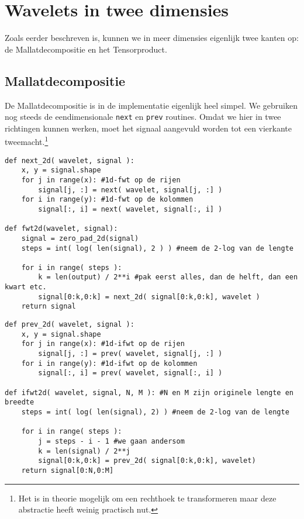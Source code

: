 \section{Wavelets in twee dimensies}
Zoals eerder beschreven is, kunnen we in meer dimensies eigenlijk twee kanten op: de Mallatdecompositie en het Tensorproduct.

\subsection{Mallatdecompositie}
De Mallatdecompositie is in de implementatie eigenlijk heel simpel. We gebruiken nog steeds de eendimensionale \texttt{next} en \texttt{prev} routines. Omdat we hier in twee richtingen kunnen werken, moet het signaal aangevuld worden tot een vierkante tweemacht.\footnote{Het is in theorie mogelijk om een rechthoek te transformeren maar deze abstractie heeft weinig practisch nut.}

\begin{lstlisting}[caption=De Mallatdecompositie in 2 dimensies]
def next_2d( wavelet, signal ):
	x, y = signal.shape
	for j in range(x): #1d-fwt op de rijen
		signal[j, :] = next( wavelet, signal[j, :] )
	for i in range(y): #1d-fwt op de kolommen
		signal[:, i] = next( wavelet, signal[:, i] )

def fwt2d(wavelet, signal):
	signal = zero_pad_2d(signal)
	steps = int( log( len(signal), 2 ) ) #neem de 2-log van de lengte
	
	for i in range( steps ):
		k = len(output) / 2**i #pak eerst alles, dan de helft, dan een kwart etc.
		signal[0:k,0:k] = next_2d( signal[0:k,0:k], wavelet )
	return signal
\end{lstlisting}
\begin{lstlisting}[caption=De omgekeerde Mallatdecompositie in 2 dimensies]
def prev_2d( wavelet, signal ):
	x, y = signal.shape
	for j in range(x): #1d-ifwt op de rijen
		signal[j, :] = prev( wavelet, signal[j, :] )
	for i in range(y): #1d-ifwt op de kolommen
		signal[:, i] = prev( wavelet, signal[:, i] )

def ifwt2d( wavelet, signal, N, M ): #N en M zijn originele lengte en breedte
	steps = int( log( len(signal), 2) ) #neem de 2-log van de lengte
	
	for i in range( steps ):
		j = steps - i - 1 #we gaan andersom
		k = len(signal) / 2**j
		signal[0:k,0:k] = prev_2d( signal[0:k,0:k], wavelet)
	return signal[0:N,0:M]
\end{lstlisting}
